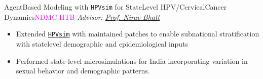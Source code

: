 \begin{projects}
\project
  {Agent\textendash Based Modeling with \texttt{HPVsim} for State\textendash Level HPV/Cervical\textendash Cancer Dynamics}{\textcolor{magenta}{NDMC IITB}}
  { \textit{Advisor: \href{https://www.iitmz.ac.in/schools/engineering-and-science/faculty/dr-nirav-bhatt}{Prof. Nirav Bhatt}} }
  {\begin{itemize}
  \setlength\itemsep{0.3em}
  \item Extended \href{https://www.idmod.org/tool/hpvsim/}{\texttt{HPVsim}} with maintained patches to enable subnational stratification with state\textendash level demographic and epidemiological inputs
   \item Performed state-level microsimulations for India incorporating variation in sexual behavior and demographic patterns.
\end{itemize}}
\end{projects}
\vspace{-3mm}


